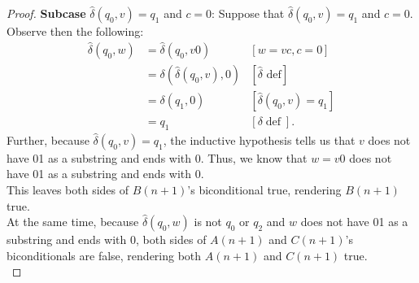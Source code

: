 \documentclass[10pt]{article}
\begin{document}
\begin{enumerate}[label={}]
\begin{proof}
              \textbf{Subcase }$\hat{\delta}\left(q_0, v\right)=q_1$ and $c=0$: Suppose that $\hat{\delta}\left(q_0, v\right)=q_1$ and $c=0$. Observe then the following:
              $$
                  \begin{aligned}
                      \hat{\delta}\left(q_0, w\right) & =\hat{\delta}\left(q_0, v 0\right)                     & {[w=v c, c=0] }                                     \\
                                                      & =\delta\left(\hat{\delta}\left(q_0, v\right), 0\right) & {[\hat{\delta} \text { def}] }                      \\
                                                      & =\delta\left(q_1, 0\right)                             & {\left[\hat{\delta}\left(q_0, v\right)=q_1\right] } \\
                                                      & =q_1                                                   & {[\delta \operatorname{def}] . }
                  \end{aligned}
              $$
              Further, because $\hat{\delta}\left(q_0, v\right)=q_1$, the inductive hypothesis tells us that $v$ does not have 01 as a substring and ends with 0. Thus, we know that $w=v0$ does not have 01 as a substring and ends with 0.\\
              This leaves both sides of $B(n+1)$'s biconditional true, rendering $B(n+1)$ true.\\
              At the same time, because $\hat{\delta}\left(q_0, w\right)$ is not $q_0$ or $q_2$ and $w$ does not have 01 as a substring and ends with 0, both sides of $A(n+1)$ and $C(n+1)$'s biconditionals are false, rendering both $A(n+1)$ and $C(n+1)$ true.\\


\end{proof}
\end{enumerate}
\end{document}
